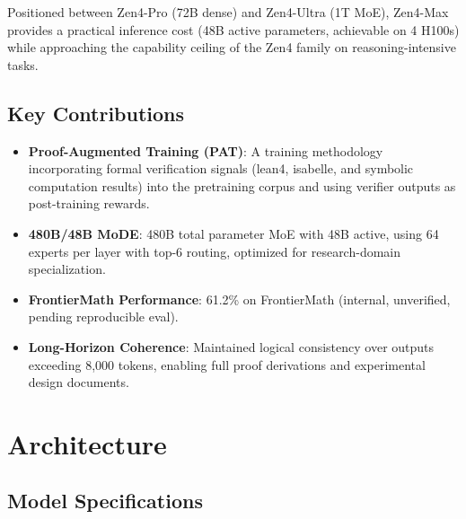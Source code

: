 \documentclass[11pt,a4paper]{article}
\begin{document}
Positioned between Zen4-Pro (72B dense) and Zen4-Ultra (1T MoE), Zen4-Max provides a
practical inference cost (48B active parameters, achievable on 4 H100s) while approaching
the capability ceiling of the Zen4 family on reasoning-intensive tasks.

\subsection{Key Contributions}

\begin{itemize}
    \item \textbf{Proof-Augmented Training (PAT)}: A training methodology incorporating
    formal verification signals (lean4, isabelle, and symbolic computation results) into
    the pretraining corpus and using verifier outputs as post-training rewards.
    \item \textbf{480B/48B MoDE}: 480B total parameter MoE with 48B active, using 64 experts
    per layer with top-6 routing, optimized for research-domain specialization.
    \item \textbf{FrontierMath Performance}: 61.2\% on FrontierMath (internal, unverified, pending reproducible eval).
    \item \textbf{Long-Horizon Coherence}: Maintained logical consistency over outputs
    exceeding 8,000 tokens, enabling full proof derivations and experimental design documents.
\end{itemize}

\section{Architecture}

\subsection{Model Specifications}
\end{document}
